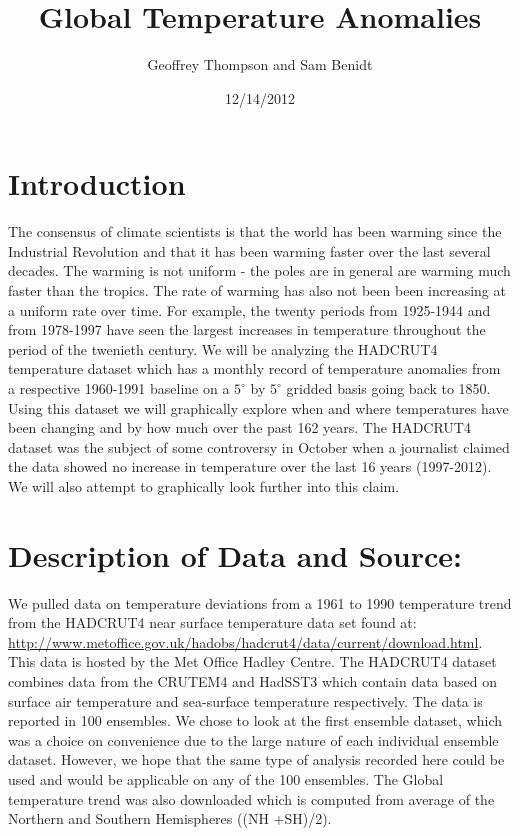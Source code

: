 \documentclass{article}\usepackage{graphicx, color}
\title{Global Temperature Anomalies}
\author{Geoffrey Thompson and Sam Benidt}
\date{12/14/2012}
\begin{document}
\maketitle






\section{Introduction}
The consensus of climate scientists is that the world has been warming since the Industrial Revolution and that it has been warming faster over the last several decades. The warming is not uniform - the poles are in general are warming much faster than the tropics. The rate of warming has also not been been increasing at a uniform rate over time. For example, the twenty periods from 1925-1944 and from 1978-1997 have seen the largest increases in temperature throughout the period of the twenieth century. We will be analyzing the HADCRUT4 temperature dataset which has a monthly record of temperature anomalies from a respective 1960-1991 baseline on a $5^{\circ}$ by $5^{\circ}$ gridded basis going back to 1850.  Using this dataset we will graphically explore when and where temperatures have been changing and by how much over the past 162 years. The HADCRUT4 dataset was the subject of some controversy in October when a journalist claimed the data showed no increase in temperature over the last 16 years (1997-2012). We will also attempt to graphically look further into this claim.

\section{Description of Data and Source:}
We pulled data on temperature deviations from a 1961 to 1990 temperature trend from the HADCRUT4 near surface temperature data set found at: \url{http://www.metoffice.gov.uk/hadobs/hadcrut4/data/current/download.html}.\\ This data is hosted by the Met Office Hadley Centre. The HADCRUT4 dataset combines data from the  CRUTEM4 and HadSST3 which contain data based on surface air temperature and sea-surface temperature respectively. The data is reported in 100 ensembles. We chose to look at the first ensemble dataset, which was a choice on convenience due to the large nature of each individual ensemble dataset. However, we hope that the same type of analysis recorded here could be used and would be applicable on any of the 100 ensembles.  The Global temperature trend was also downloaded which is computed from average of the Northern and Southern Hemispheres ((NH +SH)/2).
\end{document}
